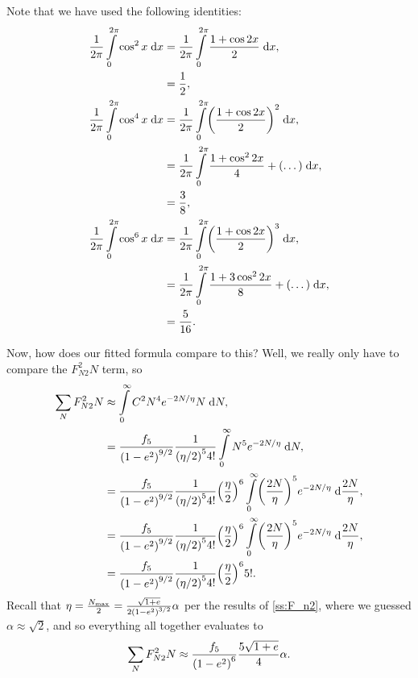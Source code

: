 \documentclass[11pt,
        usenames, %
        dvipsnames %
    ]{article}
\DeclarePairedDelimiter\p{\lparen}{\rparen}
\begin{document}
Note that we have used the following identities:
\begin{align}
    \frac{1}{2\pi}\int\limits_0^{2\pi}\cos^2x\;\mathrm{d}x
        &= \frac{1}{2\pi}
            \int\limits_0^{2\pi}\frac{1 + \cos 2x}{2}\;\mathrm{d}x,\nonumber\\
        &= \frac{1}{2},\\
    \frac{1}{2\pi}\int\limits_0^{2\pi}\cos^4x\;\mathrm{d}x
        &= \frac{1}{2\pi}
            \int\limits_0^{2\pi}\p*{\frac{1 + \cos 2x}{2}}^2\;\mathrm{d}x
                ,\nonumber\\
        &= \frac{1}{2\pi}
            \int\limits_0^{2\pi}\frac{1 + \cos^2 2x}{4}
                + (\dots)\;\mathrm{d}x,\nonumber\\
        &= \frac{3}{8},\\
    \frac{1}{2\pi}\int\limits_0^{2\pi}\cos^6x\;\mathrm{d}x
        &= \frac{1}{2\pi}
            \int\limits_0^{2\pi}\p*{\frac{1 + \cos 2x}{2}}^3\;\mathrm{d}x
                ,\nonumber\\
        &= \frac{1}{2\pi}
            \int\limits_0^{2\pi}\frac{1 + 3\cos^2 2x}{8}
                 + (\dots)\;\mathrm{d}x,\nonumber\\
        &= \frac{5}{16}.
\end{align}

Now, how does our fitted formula compare to this? Well, we really only have to
compare the $F_{N2}^2N$ term, so
\begin{align}
    \sum\limits_{N}F_{N2}^2N &\approx \int\limits_0^\infty
            C^2 N^4 e^{-2N/\eta}N\;\mathrm{d}N,\\
        &= \frac{f_5}{\p*{1 - e^2}^{9/2}}
                \frac{1}{\p*{\eta / 2}^5 4!}
            \int\limits_0^\infty N^5 e^{-2N/\eta}\;\mathrm{d}N,\\
        &= \frac{f_5}{\p*{1 - e^2}^{9/2}}
                \frac{1}{\p*{\eta / 2}^5 4!}
            \p*{\frac{\eta}{2}}^6
            \int\limits_0^\infty \p*{\frac{2N}{\eta}}^5
                e^{-2N/\eta}\;\mathrm{d}\frac{2N}{\eta},\\
        &= \frac{f_5}{\p*{1 - e^2}^{9/2}}
                \frac{1}{\p*{\eta / 2}^5 4!}
            \p*{\frac{\eta}{2}}^6
            \int\limits_0^\infty \p*{\frac{2N}{\eta}}^5
                e^{-2N/\eta}\;\mathrm{d}\frac{2N}{\eta},\\
        &= \frac{f_5}{\p*{1 - e^2}^{9/2}}
                \frac{1}{\p*{\eta / 2}^5 4!}
            \p*{\frac{\eta}{2}}^6 5!.
\end{align}
Recall that $\eta = \frac{N_{\max}}{2} = \frac{\sqrt{1 + e}}{2\p*{1 -
e^2}^{3/2}}\alpha$ per the results of \autoref{ss:F_n2}, where we guessed $\alpha
\approx \sqrt{2}$, and so everything all together evaluates to
\begin{equation}
    \sum\limits_{N}F_{N2}^2N \approx \frac{f_5}{\p*{1 - e^2}^{6}}
        \frac{5\sqrt{1 + e}}{4}\alpha.
\end{equation}
\end{document}
